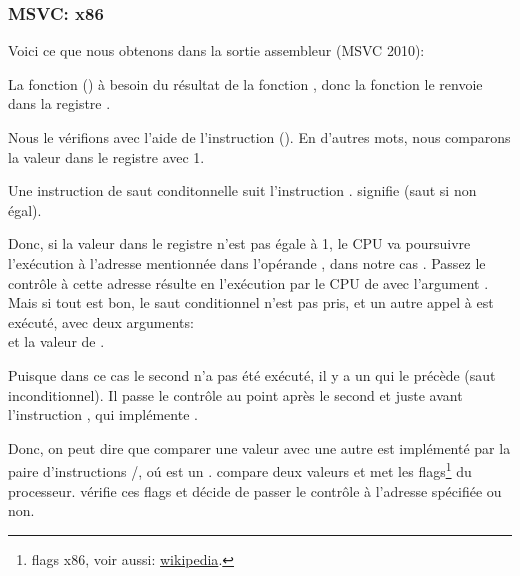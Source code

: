 \subsubsection{MSVC: x86}

Voici ce que nous obtenons dans la sortie assembleur (MSVC 2010):



La fonction  (\main) à besoin du résultat de la fonction
, donc la fonction  le renvoie
dans la registre \EAX.

Nous le vérifions avec l'aide de l'instruction  ().
En d'autres mots, nous comparons la valeur dans le registre \EAX avec 1.

Une instruction de saut conditonnelle \JNE suit l'instruction \CMP. \JNE signifie
 (saut si non égal).

Donc, si la valeur dans le registre \EAX n'est pas égale à 1, le \ac{CPU} va poursuivre
l'exécution à l'adresse mentionnée dans l'opérande \JNE, dans notre cas .
Passez le contrôle à cette adresse résulte en l'exécution par le \ac{CPU} de
\printf avec l'argument .
Mais si tout est bon, le saut conditionnel n'est pas pris, et un autre appel à \printf
est exécuté, avec deux arguments:\\
 et la valeur de .

Puisque dans ce cas le second \printf n'a pas été exécuté, il y a un \JMP qui le précède (saut inconditionnel).
Il passe le contrôle au point après le second \printf et juste avant l'instruction , qui implémente .

Donc, on peut dire que comparer une valeur avec une autre est  implémenté
par la paire d'instructions \CMP/\Jcc, oú  est un .
\CMP compare deux valeurs et met les flags\footnote{flags x86, voir aussi: \href{http://go.yurichev.com/17120}{wikipedia}.}
du processeur.
\Jcc vérifie ces flags et décide de passer le contrôle à l'adresse spécifiée ou non.

